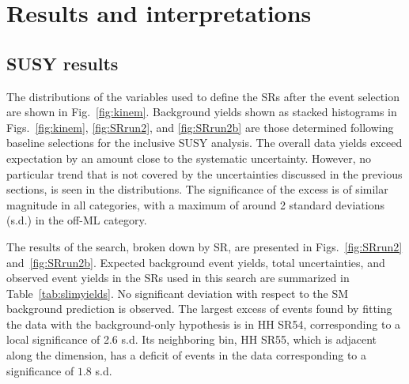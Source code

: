 \chapter{Results and interpretations}
\label{sec:results}
\section{SUSY results}
\label{sec:ssresults}

The distributions of the variables used to define the SRs after the event selection are
shown in Fig.~\ref{fig:kinem}.
Background yields shown as stacked histograms in Figs.~\ref{fig:kinem}, \ref{fig:SRrun2}, and \ref{fig:SRrun2b} are
those determined following baseline selections for the inclusive SUSY analysis.
The overall data yields exceed expectation by an amount close to the systematic uncertainty.
However, no particular trend that is not covered by the uncertainties discussed in the previous sections,
is seen in the distributions.
The significance of the excess is of similar magnitude in all categories, with a maximum of around 2 standard deviations (s.d.) in the off-\PZ ML category. 

The results of the search, broken down by SR,
are presented in Figs.~\ref{fig:SRrun2} and~\ref{fig:SRrun2b}.
Expected background event yields, total uncertainties, and observed event yields in the SRs used in this search
are summarized in Table~\ref{tab:slimyields}.
No significant deviation with respect to the SM background prediction is observed.
The largest excess of events found by fitting the data with the background-only
hypothesis is in HH SR54,
corresponding to a local significance of 2.6 s.d.
Its neighboring bin, HH SR55, which is adjacent along the \HT dimension, has a
deficit of events in the data corresponding to a
significance of $1.8$ s.d.

